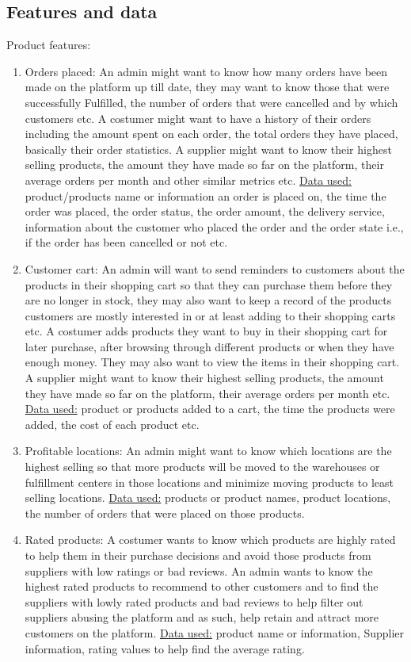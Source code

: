 \documentclass{article}
\begin{document}
\subsection{Features and data}

Product features:
\begin{enumerate}
  \item Orders placed: An admin might want to know how many orders have been made on the platform up till date, they may want to know those that were successfully Fulfilled, the number of orders that were cancelled and by which customers etc. A costumer might want to have a history of their orders including the amount spent on each order, the total orders they have placed, basically their order statistics. A supplier might want to know their highest selling products, the amount they have made so far on the platform, their average orders per month and other similar metrics etc. \underline{Data used:} product/products name or information an order is placed on, the time the order was placed, the order status, the order amount, the delivery service, information about the customer who placed the order and the order state i.e., if the order has been cancelled or not etc.
  \item Customer cart: An admin will want to send reminders to customers about the products in their shopping cart so that they can purchase them before they are no longer in stock, they may also want to keep a record of the products customers are mostly interested in or at least adding to their shopping carts etc. A costumer adds products they want to buy in their shopping cart for later purchase, after browsing through different products or when they have enough money. They may also want to view the items in their shopping cart. A supplier might want to know their highest selling products, the amount they have made so far on the platform, their average orders per month etc. \underline{Data used:} product or products added to a cart, the time the products were added, the cost of each product etc.
  \item Profitable locations: An admin might want to know which locations are the highest selling so that more products will be moved to the warehouses or fulfillment centers in those locations and minimize moving products to least selling locations. \underline{Data used:} products or product names, product locations, the number of orders that were placed on those products.
  \item Rated products: A costumer wants to know which products are highly rated to help them in their purchase decisions and avoid those products from suppliers with low ratings or bad reviews. An admin wants to know the highest rated products to recommend to other customers and to find the suppliers with lowly rated products and bad reviews to help filter out suppliers abusing the platform and as such, help retain and attract more customers on the platform.  \underline{Data used:} product name or information, Supplier information, rating values to help find the average rating.

\end{enumerate}
\end{document}
